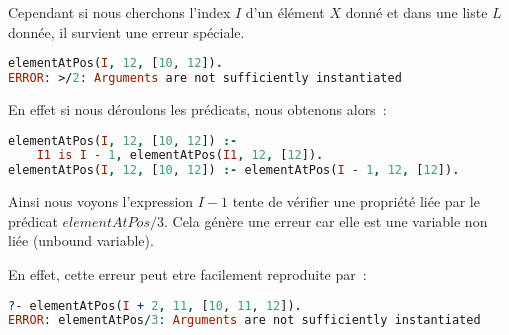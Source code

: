 Cependant si nous cherchons l'index $I$ d'un élément
$X$ donné et dans une liste $L$ donnée, il survient une erreur spéciale.
\begin{lstlisting}[language=Prolog,frame=single]
elementAtPos(I, 12, [10, 12]).
ERROR: >/2: Arguments are not sufficiently instantiated
\end{lstlisting}

En effet si nous déroulons les prédicats, nous obtenons alors~:
\begin{lstlisting}[language=Prolog,frame=single]
elementAtPos(I, 12, [10, 12]) :-
    I1 is I - 1, elementAtPos(I1, 12, [12]).
elementAtPos(I, 12, [10, 12]) :- elementAtPos(I - 1, 12, [12]).
\end{lstlisting}

Ainsi nous voyons l'expression $I - 1$ tente de vérifier une propriété liée par le prédicat
$elementAtPos/3$. Cela génère une erreur car elle est une variable non liée (unbound variable).

En effet, cette erreur peut etre facilement reproduite par~:
\begin{lstlisting}[language=Prolog,frame=single]
?- elementAtPos(I + 2, 11, [10, 11, 12]).
ERROR: elementAtPos/3: Arguments are not sufficiently instantiated
\end{lstlisting}
